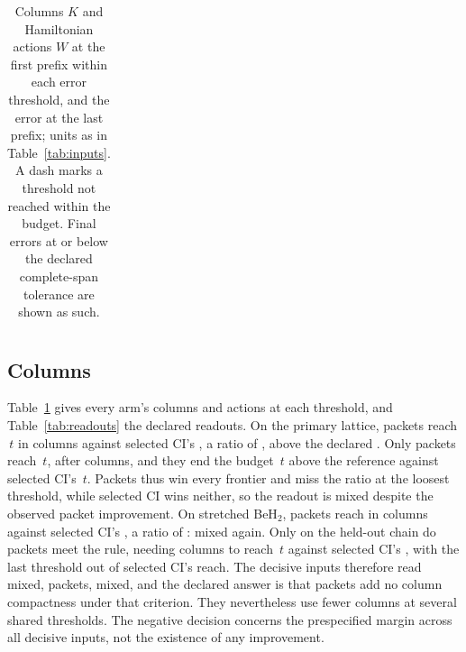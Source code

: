 \documentclass[aps,pra,reprint,superscriptaddress,nofootinbib,floatfix,
  showkeys,raggedbottom]{revtex4-2}
\newcommand{\tightcolumns}{\setlength{\tabcolsep}{3.2pt}}
\begin{document}
\begin{table}[t]
\caption{Columns $K$ and Hamiltonian actions $W$ at the first prefix within
each error threshold, and the error at the last prefix; units as in
Table~\ref{tab:inputs}. A dash marks a threshold not reached within the
budget. Final errors at or below the declared complete-span tolerance are
shown as such.}
\label{tab:thresholds}
\begin{ruledtabular}
\tightcolumns
\begin{tabular}{lrrrrrrrrr}

\end{tabular}
\end{ruledtabular}
\end{table}

\subsection{Columns}
\label{sec:columns}

Table~\ref{tab:thresholds} gives every arm's columns and actions at each
threshold, and Table~\ref{tab:readouts} the declared readouts. On the primary
lattice, packets reach \pkThresholdOne\,$t$ in \pkPrimaryPacketsColumnsOne{} columns against
selected CI's \pkPrimarySciColumnsOne{}, a ratio of \pkPrimaryColumnRatioOne{},
above the declared \pkCompactRatio{}. Only packets reach \pkThresholdTenth\,$t$, after
\pkPrimaryPacketsColumnsTenth{} columns, and they end the budget
\pkPrimaryPacketsFinalError{}\,$t$ above the reference against selected CI's
\pkPrimarySciFinalError{}\,$t$. Packets thus win every frontier and miss the
ratio at the loosest threshold, while selected CI wins neither, so the
readout is mixed despite the observed packet improvement. On stretched BeH$_2$, packets reach \pkTightTarget{} in
\pkBerylliumPacketsColumnsTight{} columns against selected CI's
\pkBerylliumSciColumnsTight{}, a ratio of \pkBerylliumColumnRatioTight{}:
mixed again. Only on the held-out chain do packets meet the rule, needing
\pkChainPacketsColumns{} columns to reach \pkChainPacketThresholds\,$t$
against selected CI's \pkChainSciColumns{}, with the last threshold out of
selected CI's reach.
The decisive inputs therefore read mixed, packets, mixed, and the declared
answer is that packets add no column compactness under that criterion.
They nevertheless use fewer columns at several shared thresholds. The
negative decision concerns the prespecified margin across all decisive inputs,
not the existence of any improvement.
\end{document}
